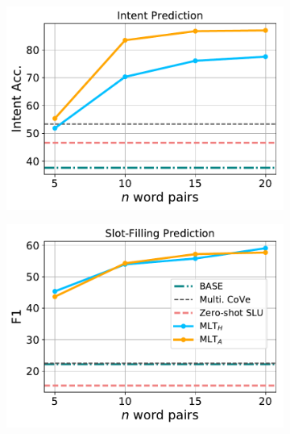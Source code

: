 \documentclass[letterpaper]{article} %
\begin{document}
\begin{figure}[!ht]
\centering
\begin{subfigure}{.24\textwidth}
    \centering
    \includegraphics[scale=0.32]{es_intent.pdf}
    \caption{}
    \label{fig:intent-es}
\end{subfigure}
\begin{subfigure}{.24\textwidth}
    \centering
    \includegraphics[scale=0.32]{es_slot.pdf}
    \caption{}
    \label{fig:slot-es}
\end{subfigure}
\begin{subfigure}{.24\textwidth}
    \centering

\end{subfigure}
\end{figure}
\end{document}
